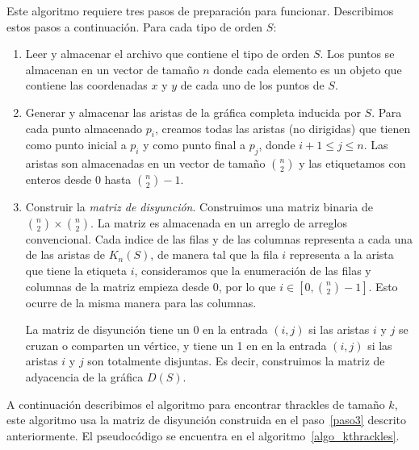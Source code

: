   Este algoritmo requiere tres pasos de preparación para funcionar. Describimos estos pasos a continuación. Para cada tipo de orden $S$:
  \begin{enumerate}
    \item Leer y almacenar el archivo que contiene el tipo de orden $S$.
    Los puntos se almacenan en un vector de tamaño $n$ donde cada elemento es
    un objeto que contiene las coordenadas $x$ y $y$ de cada uno de los puntos
    de $S$.
    \item Generar y almacenar las aristas de la gráfica completa inducida por
    $S$. Para cada punto almacenado $p_i$, creamos todas las aristas (no
    dirigidas) que tienen como punto inicial a $p_i$ y como punto final a $p_j$,
    donde $ i+1 \leq j \leq n$.
    Las aristas son almacenadas en un vector de tamaño $\binom{n}{2}$ y las
    etiquetamos con enteros desde $0$ hasta $\binom{n}{2}-1$.
    \item \label{paso3}Construir la \emph{matriz de disyunción}.
    Construimos una matriz binaria de $\binom{n}{2}\times \binom{n}{2}$. La
    matriz es almacenada en un arreglo de arreglos convencional. Cada
    indice de las filas y de las columnas representa a cada una de las aristas
    de $K_n(S)$, de manera tal que la fila $i$ representa a la arista que tiene
    la etiqueta $i$, consideramos que la enumeración de las filas y columnas de
    la matriz empieza desde $0$, por lo que $i \in [0,\binom{n}{2}-1]$. Esto ocurre de la misma
    manera para las columnas.

    La matriz de disyunción tiene un 0 en la entrada $(i,j)$ si las aristas $i$ y $j$ se cruzan o
    comparten un vértice, y tiene un 1 en en la entrada $(i,j)$ si las aristas $i$ y $j$ son
    totalmente disjuntas. Es decir, construimos la
    matriz de adyacencia de la gráfica $D(S)$.
  \end{enumerate}

  A continuación describimos el algoritmo para encontrar thrackles
  de tamaño $k$, este algoritmo usa la matriz de disyunción construida en el
  paso~\ref{paso3} descrito anteriormente. El pseudocódigo se encuentra en el
  algoritmo~\ref{algo_kthrackles}.

